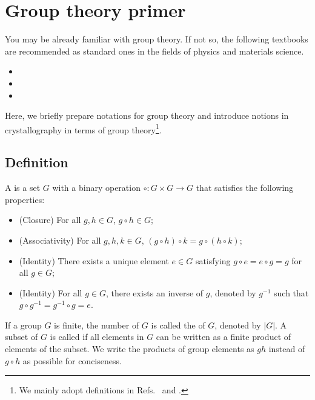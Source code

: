 \section{\label{sec:group_primer}Group theory primer}

You may be already familiar with group theory.
If not so, the following textbooks are recommended as standard ones in the fields of physics and materials science.
\begin{itemize}
  \item {}
  \item {}
  \item {}
\end{itemize}
Here, we briefly prepare notations for group theory and introduce notions in crystallography in terms of group theory\footnote{
  We mainly adopt definitions in Refs.~\cite{ITA2016} and \cite{holt2005handbook}.
}.

\subsection{Definition}

\begin{screen}
  \begin{defn}
    A  is a set $G$ with a binary operation $\circ: G \times G \to G$ that satisfies the following properties:
    \begin{itemize}
      \item (Closure) For all $g, h \in G$, $g \circ h \in G$;
      \item (Associativity) For all $g, h, k \in G$, $(g \circ h) \circ k = g \circ (h \circ k)$;
      \item (Identity) There exists a unique element $e \in G$ satisfying $g \circ e = e \circ g = g$ for all $g \in G$;
      \item (Identity) For all $g \in G$, there exists an inverse of $g$, denoted by $g^{-1}$ such that $g \circ g^{-1} = g^{-1} \circ g = e$.
    \end{itemize}
  \end{defn}
\end{screen}

If a group $G$ is finite, the number of $G$ is called the  of $G$, denoted by $|G|$.
A subset of $G$ is called  if all elements in $G$ can be written as a finite product of elements of the subset.
We write the products of group elements as $gh$ instead of $g \circ h$ as possible for conciseness.

